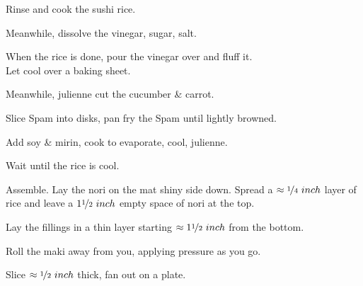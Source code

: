 \begin{preparation}
	\item Rinse and cook the sushi rice.
	\item Meanwhile, dissolve the vinegar, sugar, salt.
	\item When the rice is done, pour the vinegar over and fluff it.\\
		Let cool over a baking sheet.
	\item Meanwhile, julienne cut the cucumber \& carrot.
	\item Slice Spam into disks, pan fry the Spam until lightly browned.
	\item Add soy \& mirin, cook to evaporate, cool, julienne.
	\item Wait until the rice is cool.
	\item Assemble. Lay the nori on the mat shiny side down. Spread a $\approx\nicefrac{1}{4}~inch$ layer of rice and leave a $1 \nicefrac{1}{2}~inch$ empty space of nori at the top.
	\item Lay the fillings in a thin layer starting $\approx1\nicefrac{1}{2}~inch$ from the bottom.
	\item Roll the maki away from you, applying pressure as you go.
	\item Slice $\approx\nicefrac{1}{2}~inch$ thick, fan out on a plate.
\end{preparation}


\recipeend%

